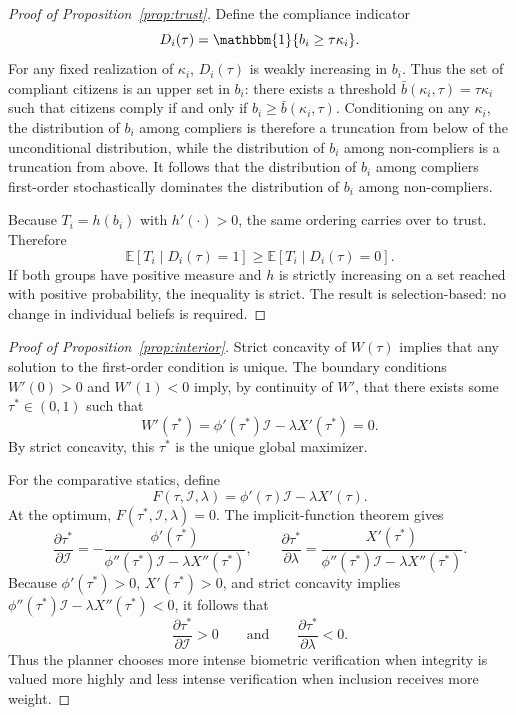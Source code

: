 \begin{proof}[Proof of Proposition~\ref{prop:trust}]
Define the compliance indicator
\[
D_i(\tau)=\mathbbm{1}\{b_i \geq \tau \kappa_i\}.
\]
For any fixed realization of $\kappa_i$, $D_i(\tau)$ is weakly increasing in $b_i$. Thus the set of compliant citizens is an upper set in $b_i$: there exists a threshold $\bar b(\kappa_i,\tau)=\tau \kappa_i$ such that citizens comply if and only if $b_i \geq \bar b(\kappa_i,\tau)$. Conditioning on any $\kappa_i$, the distribution of $b_i$ among compliers is therefore a truncation from below of the unconditional distribution, while the distribution of $b_i$ among non-compliers is a truncation from above. It follows that the distribution of $b_i$ among compliers first-order stochastically dominates the distribution of $b_i$ among non-compliers.

Because $T_i=h(b_i)$ with $h'(\cdot)>0$, the same ordering carries over to trust. Therefore
\[
\mathbb{E}[T_i \mid D_i(\tau)=1] \geq \mathbb{E}[T_i \mid D_i(\tau)=0].
\]
If both groups have positive measure and $h$ is strictly increasing on a set reached with positive probability, the inequality is strict. The result is selection-based: no change in individual beliefs is required.
\end{proof}

\begin{proof}[Proof of Proposition~\ref{prop:interior}]
Strict concavity of $W(\tau)$ implies that any solution to the first-order condition is unique. The boundary conditions $W'(0)>0$ and $W'(1)<0$ imply, by continuity of $W'$, that there exists some $\tau^\ast \in (0,1)$ such that
\[
W'(\tau^\ast)=\phi'(\tau^\ast)\mathcal{I}-\lambda X'(\tau^\ast)=0.
\]
By strict concavity, this $\tau^\ast$ is the unique global maximizer.

For the comparative statics, define
\[
F(\tau,\mathcal{I},\lambda)=\phi'(\tau)\mathcal{I}-\lambda X'(\tau).
\]
At the optimum, $F(\tau^\ast,\mathcal{I},\lambda)=0$. The implicit-function theorem gives
\[
\frac{\partial \tau^\ast}{\partial \mathcal{I}}=-\frac{\phi'(\tau^\ast)}{\phi''(\tau^\ast)\mathcal{I}-\lambda X''(\tau^\ast)},
\qquad
\frac{\partial \tau^\ast}{\partial \lambda}=\frac{X'(\tau^\ast)}{\phi''(\tau^\ast)\mathcal{I}-\lambda X''(\tau^\ast)}.
\]
Because $\phi'(\tau^\ast)>0$, $X'(\tau^\ast)>0$, and strict concavity implies $\phi''(\tau^\ast)\mathcal{I}-\lambda X''(\tau^\ast)<0$, it follows that
\[
\frac{\partial \tau^\ast}{\partial \mathcal{I}}>0
\qquad \text{and} \qquad
\frac{\partial \tau^\ast}{\partial \lambda}<0.
\]
Thus the planner chooses more intense biometric verification when integrity is valued more highly and less intense verification when inclusion receives more weight.
\end{proof}
